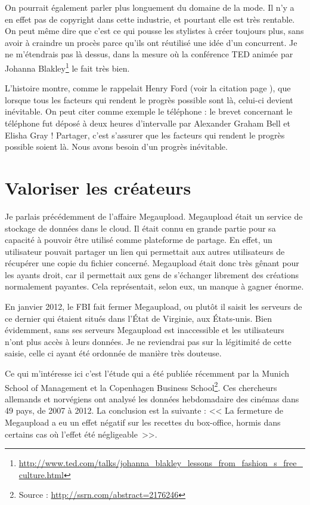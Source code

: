 On pourrait également parler plus longuement du domaine de la mode.
Il n'y a en effet pas de copyright dans cette industrie, et pourtant elle est très rentable.
On peut même dire que c'est ce qui pousse les stylistes à créer toujours plus, sans avoir à craindre un procès parce qu'ils ont réutilisé une idée d'un concurrent.
Je ne m'étendrais pas là dessus, dans la mesure où la conférence TED animée par Johanna Blakley\footnote{\url{http://www.ted.com/talks/johanna_blakley_lessons_from_fashion_s_free_culture.html}} le fait très bien.

L'histoire montre, comme le rappelait Henry Ford (voir la citation page \pageref{ford}), que lorsque tous les facteurs qui rendent le progrès possible sont là, celui-ci devient inévitable.
On peut citer comme exemple le téléphone : le brevet concernant le téléphone fut déposé à deux heures d'intervalle par Alexander Graham Bell et Elisha Gray !
Partager, c'est s'assurer que les facteurs qui rendent le progrès possible soient là.
Nous avons besoin d'un progrès inévitable.

\section{Valoriser les créateurs}

Je parlais précédemment de l'affaire Megaupload.
Megaupload était un service de stockage de données dans le cloud.
Il était connu en grande partie pour sa capacité à pouvoir être utilisé comme plateforme de partage.
En effet, un utilisateur pouvait partager un lien qui permettait aux autres utilisateurs de récupérer une copie du fichier concerné.
Megaupload était donc très gênant pour les ayants droit, car il permettait aux gens de s'échanger librement des créations normalement payantes.
Cela représentait, selon eux, un manque à gagner énorme.

En janvier 2012, le FBI fait fermer Megaupload, ou plutôt il saisit les serveurs de ce dernier qui étaient situés dans l'État de Virginie, aux États-unis.
Bien évidemment, sans ses serveurs Megaupload est inaccessible et les utilisateurs n'ont plus accès à leurs données.
Je ne reviendrai pas sur la légitimité de cette saisie, celle ci ayant été ordonnée de manière très douteuse.

Ce qui m'intéresse ici c'est l'étude qui a été publiée récemment par la Munich School of Management et la Copenhagen Business School\footnote{Source : \url{http://ssrn.com/abstract=2176246}}.
Ces chercheurs allemands et norvégiens ont analysé les données hebdomadaire des cinémas dans 49 pays, de 2007 à 2012.
La conclusion est la suivante : << La fermeture de Megaupload a eu un effet négatif sur les recettes du box-office, hormis dans certains cas où l'effet été négligeable~>>.


